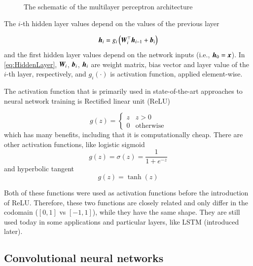 \begin{figure}
    \caption{The schematic of the multilayer perceptron architecture}
    \label{fig:MLPArch}
\end{figure}

The $i$-th hidden layer values depend on the values of the previous layer

\begin{equation}
    {\bm{h}}_i = g_i\left({\bm{W}}_i^{\top}{\bm{h}}_{i-1}+{\bm{b}}_i \right)
    \label{eq:HiddenLayer}
\end{equation}
and the first hidden layer values depend on the network inputs (i.e., ${\bm{h}}_0={\bm{x}}$). In \cref{eq:HiddenLayer}, ${\bm{W}}_i$, ${\bm{b}}_i$, ${\bm{h}}_i$ are weight matrix, bias vector and layer value of the $i$-th layer, respectively, and $g_i(\cdot)$ is activation function, applied element-wise.

The activation function that is primarily used in state-of-the-art approaches to neural network training is Rectified linear unit (ReLU)

\[
    g(z)=\begin{cases}
    z & z>0\\
    0 & \textrm{otherwise}
    \end{cases}
\]
which has many benefits, including that it is computationally cheap. There are other activation functions, like logistic sigmoid
\[
    g(z)=\sigma(z)=\frac{1}{1+e^{-z}}
    \label{eq:Sigmoid}
\]
and hyperbolic tangent
\[
    g(z)=\tanh(z)
\]

Both of these functions were used as activation functions before the introduction of ReLU. Therefore, these two functions are closely related and only differ in the codomain ($[0, 1]$ vs $[-1, 1]$), while they have the same shape. They are still used today in some applications and particular layers, like LSTM (introduced later).

\subsection{Convolutional neural networks}

